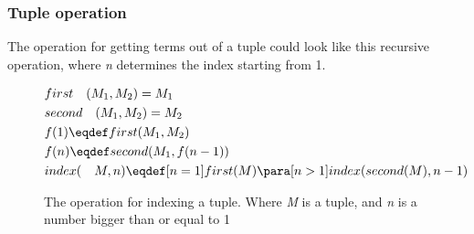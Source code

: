 \subsubsection{Tuple operation}
The operation for getting terms out of a tuple could look like this recursive operation, where \textit{n} determines the index starting from 1.
\begin{figure}[h]
    \begin{align*}
        &first \quad (M_1, M_2) = M_1\\
        &second \quad (M_1, M_2) = M_2\\
        &f(1) \eqdef first(M_1, M_2)\\
        &f(n) \eqdef second(M_1, f(n-1))\\
        &index( \quad M, n) \eqdef [n = 1]first(M)\para [n > 1]index(second(M), n-1)
    \end{align*}
    \caption{The operation for indexing a tuple. Where \textit{M} is a tuple, and \textit{n} is a number bigger than  or equal to 1}
\end{figure}
\FloatBarrier
